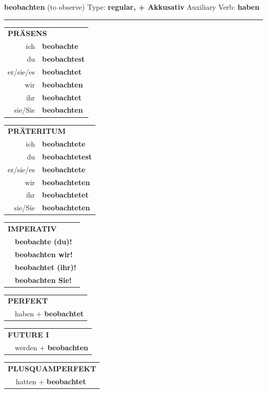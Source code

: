 \documentclass[10pt,a4paper]{revtex4-2}
\begin{document}
\begin{verbbox-acc}
{\Large \bf beobachten} (to observe) \hfill Type: \textbf{regular, + Akkusativ} \hfill Auxiliary Verb: \textbf{haben} 

\vspace{5pt}
\hrule
\vspace{5pt}

\begin{tabular}{rl}
\multicolumn{2}{l}{\textbf{PRÄSENS}}\\
ich & \textbf{beobachte}\\
du & \textbf{beobachtest}\\
er/sie/es & \textbf{beobachtet}\\
wir & \textbf{beobachten}\\
ihr & \textbf{beobachtet}\\
sie/Sie & \textbf{beobachten}\\
\end{tabular}
\hfill
\begin{tabular}{rl}
\multicolumn{2}{l}{\textbf{PRÄTERITUM}}\\
ich & \textbf{beobachtete}\\
du & \textbf{beobachtetest}\\
er/sie/es & \textbf{beobachtete}\\
wir & \textbf{beobachteten}\\
ihr & \textbf{beobachtetet}\\
sie/Sie & \textbf{beobachteten}\\
\end{tabular}
\hfill
\begin{tabular}{rl}
\multicolumn{2}{l}{\textbf{IMPERATIV}}\\
& \textbf{beobachte (du)!}\\
& \textbf{beobachten wir!}\\
& \textbf{beobachtet (ihr)!}\\
& \textbf{beobachten Sie!}\\
\end{tabular}

\vspace{10pt}

\begin{tabular}{rl}
\multicolumn{2}{l}{\textbf{PERFEKT}}\\
& haben + \textbf{beobachtet}\\
\end{tabular}
\hfill
\begin{tabular}{rl}
\multicolumn{2}{l}{\textbf{FUTURE I}}\\
& werden + \textbf{beobachten}\\
\end{tabular}
\hfill
\begin{tabular}{rl}
\multicolumn{2}{l}{\textbf{PLUSQUAMPERFEKT}}\\
& hatten + \textbf{beobachtet}\\
\end{tabular}


\end{verbbox-acc}
\end{document}

